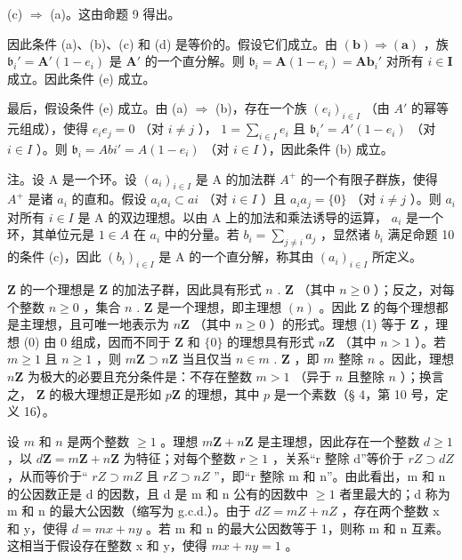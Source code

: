 (c) \(\Rightarrow\) (a)。这由命题 9 得出。

因此条件 (a)、(b)、(c) 和 (d) 是等价的。假设它们成立。由 \((\mathbf{b}) \Rightarrow (\mathbf{a})\) ，族 \(\mathfrak{b}_i' = \mathbf{A}'(1 - e_i)\) 是 \(\mathbf{A}'\) 的一个直分解。则 \(\mathfrak{b}_i = \mathbf{A}(1 - e_i) = \mathbf{Ab}_i'\) 对所有 \(i \in \mathbf{I}\) 成立。因此条件 (e) 成立。

最后，假设条件 (e) 成立。由 (a) \(\Rightarrow\) (b)，存在一个族 \((e_i)_{i\in I}\) （由 \(A'\) 的幂等元组成），使得 \(e_i e_j = 0\) （对 \(i \neq j\) ）， \(1 = \sum_{i\in I} e_i\) 且 \(\mathfrak{b}_i' = A'(1 - e_i)\) （对 \(i \in I\) ）。则 \(\mathfrak{b}_i = Abi' = A(1 - e_i)\) （对 \(i \in I\) ），因此条件 (b) 成立。

注。设 A 是一个环。设 \((a_{i})_{i\in I}\) 是 A 的加法群 \(A^{+}\) 的一个有限子群族，使得 \(A^{+}\) 是诸 \(a_{i}\) 的直和。假设 \(a_{i}a_{i}\subset ai\) （对 \(i\in I\) ）且 \(a_{i}a_{j} = \{0\}\) （对 \(i\neq j\) ）。则 \(a_{i}\) 对所有 \(i\in I\) 是 A 的双边理想。以由 A 上的加法和乘法诱导的运算， \(a_{i}\) 是一个环，其单位元是 \(1\in A\) 在 \(a_{i}\) 中的分量。若 \(b_{i} = \sum_{j\neq i}a_{j}\) ，显然诸 \(b_{i}\) 满足命题 10 的条件 (c)，因此 \((b_{i})_{i\in I}\) 是 A 的一个直分解，称其由 \((a_{i})_{i\in I}\) 所定义。


\(\mathbf{Z}\) 的一个理想是 \(\mathbf{Z}\) 的加法子群，因此具有形式 \(n\) . \(\mathbf{Z}\) （其中 \(n \geqslant 0\) ）；反之，对每个整数 \(n \geqslant 0\) ，集合 \(n\) . \(\mathbf{Z}\) 是一个理想，即主理想 \((n)\) 。因此 \(\mathbf{Z}\) 的每个理想都是主理想，且可唯一地表示为 \(n\mathbf{Z}\) （其中 \(n \geqslant 0\) ）的形式。理想 (1) 等于 \(\mathbf{Z}\) ，理想 (0) 由 0 组成，因而不同于 \(\mathbf{Z}\) 和 \(\{0\}\) 的理想具有形式 \(n\mathbf{Z}\) （其中 \(n > 1\) ）。若 \(m \geqslant 1\) 且 \(n \geqslant 1\) ，则 \(m\mathbf{Z} \supset n\mathbf{Z}\) 当且仅当 \(n \in m\) . \(\mathbf{Z}\) ，即 \(m\) 整除 \(n\) 。因此，理想 \(n\mathbf{Z}\) 为极大的必要且充分条件是：不存在整数 \(m > 1\) （异于 \(n\) 且整除 \(n\) ）；换言之， \(\mathbf{Z}\) 的极大理想正是形如 \(p\mathbf{Z}\) 的理想，其中 \(p\) 是一个素数（§ 4，第 10 号，定义 16）。

设 \(m\) 和 \(n\) 是两个整数 \(\geqslant 1\) 。理想 \(m\mathbf{Z} + n\mathbf{Z}\) 是主理想，因此存在一个整数 \(d \geqslant 1\) ，以 \(d\mathbf{Z} = m\mathbf{Z} + n\mathbf{Z}\) 为特征；对每个整数 \(r \geqslant 1\) ，关系“r 整除 d”等价于 \(rZ \supset dZ\) ，从而等价于“ \(rZ \supset mZ\) 且 \(rZ \supset nZ\) ”，即“r 整除 m 和 n”。由此看出，m 和 n 的公因数正是 d 的因数，且 d 是 m 和 n 公有的因数中 \(\geqslant 1\) 者里最大的；d 称为 m 和 n 的最大公因数（缩写为 g.c.d.）。由于 \(dZ = mZ + nZ\) ，存在两个整数 x 和 y，使得 \(d = mx + ny\) 。若 m 和 n 的最大公因数等于 1，则称 m 和 n 互素。这相当于假设存在整数 x 和 y，使得 \(mx + ny = 1\) 。

